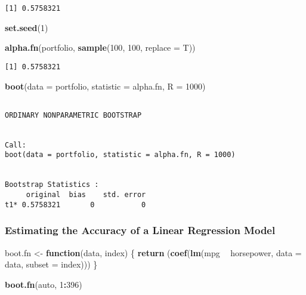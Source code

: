 \documentclass[12pt,]{report}
\newenvironment{Shaded}{\begin{snugshade}}{\end{snugshade}}
\newcommand{\ControlFlowTok}[1]{\textcolor[rgb]{0.13,0.29,0.53}{\textbf{#1}}}
\newcommand{\DataTypeTok}[1]{\textcolor[rgb]{0.13,0.29,0.53}{#1}}
\newcommand{\DecValTok}[1]{\textcolor[rgb]{0.00,0.00,0.81}{#1}}
\newcommand{\KeywordTok}[1]{\textcolor[rgb]{0.13,0.29,0.53}{\textbf{#1}}}
\newcommand{\NormalTok}[1]{#1}
\newcommand{\OperatorTok}[1]{\textcolor[rgb]{0.81,0.36,0.00}{\textbf{#1}}}
\newcommand{\StringTok}[1]{\textcolor[rgb]{0.31,0.60,0.02}{#1}}
\begin{document}
\begin{verbatim}
[1] 0.5758321
\end{verbatim}

\begin{Shaded}
\begin{Highlighting}[]
\KeywordTok{set.seed}\NormalTok{(}\DecValTok{1}\NormalTok{)}

\KeywordTok{alpha.fn}\NormalTok{(portfolio, }\KeywordTok{sample}\NormalTok{(}\DecValTok{100}\NormalTok{, }\DecValTok{100}\NormalTok{, }\DataTypeTok{replace =}\NormalTok{ T))}
\end{Highlighting}
\end{Shaded}

\begin{verbatim}
[1] 0.5758321
\end{verbatim}

\begin{Shaded}
\begin{Highlighting}[]
\KeywordTok{boot}\NormalTok{(}\DataTypeTok{data =}\NormalTok{ portfolio, }\DataTypeTok{statistic =}\NormalTok{ alpha.fn, }\DataTypeTok{R =} \DecValTok{1000}\NormalTok{)}
\end{Highlighting}
\end{Shaded}

\begin{verbatim}

ORDINARY NONPARAMETRIC BOOTSTRAP


Call:
boot(data = portfolio, statistic = alpha.fn, R = 1000)


Bootstrap Statistics :
     original  bias    std. error
t1* 0.5758321       0           0
\end{verbatim}

\hypertarget{estimating-the-accuracy-of-a-linear-regression-model}{%
\subsubsection{Estimating the Accuracy of a Linear Regression
Model}\label{estimating-the-accuracy-of-a-linear-regression-model}}

\begin{Shaded}
\begin{Highlighting}[]
\NormalTok{boot.fn <-}\StringTok{ }\ControlFlowTok{function}\NormalTok{(data, index) \{}
   \KeywordTok{return}\NormalTok{ (}\KeywordTok{coef}\NormalTok{(}\KeywordTok{lm}\NormalTok{(mpg }\OperatorTok{~}\StringTok{ }\NormalTok{horsepower, }\DataTypeTok{data =}\NormalTok{ data, }\DataTypeTok{subset =}\NormalTok{ index)))}
\NormalTok{\}}

\KeywordTok{boot.fn}\NormalTok{(auto, }\DecValTok{1}\OperatorTok{:}\DecValTok{396}\NormalTok{)}
\end{Highlighting}
\end{Shaded}
\end{document}
